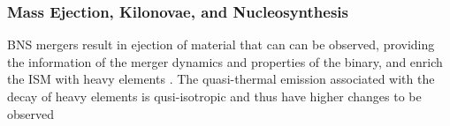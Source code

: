 


\subsubsection{Mass Ejection, Kilonovae, and Nucleosynthesis}

\ac{BNS} mergers result in ejection of material that can can be observed, providing the 
information of the merger dynamics and properties of the binary, and enrich the 
\ac{ISM} with heavy \rproc{} elements \cite{26}. The quasi-thermal emission associated with 
the decay of heavy \rproc{} elements is qusi-isotropic and thus have higher changes to be 
observed \cite{25}

